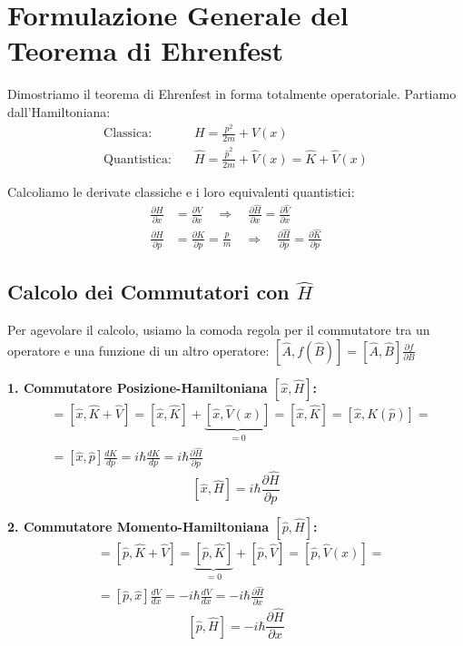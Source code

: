 \documentclass[11pt, a4paper]{article}
\begin{document}
\section{Formulazione Generale del Teorema di Ehrenfest} %

Dimostriamo il teorema di Ehrenfest in forma totalmente operatoriale. Partiamo dall'Hamiltoniana: %
\begin{align*}
    \text{Classica:} \quad & H = \frac{p^2}{2m} + V(x) \\ %
    \text{Quantistica:} \quad & \hat{H} = \frac{\hat{p}^2}{2m} + \hat{V}(x) = \hat{K} + \hat{V}(x) %
\end{align*}

Calcoliamo le derivate classiche e i loro equivalenti quantistici: %
\begin{align*}
    \frac{\partial H}{\partial x} &= \frac{\partial V}{\partial x} \quad \Rightarrow \quad \frac{\partial \hat{H}}{\partial x} = \frac{\partial \hat{V}}{\partial x} \\ %
    \frac{\partial H}{\partial p} &= \frac{\partial K}{\partial p} = \frac{p}{m} \quad \Rightarrow \quad \frac{\partial \hat{H}}{\partial p} = \frac{\partial \hat{K}}{\partial p} %
\end{align*}

\subsection{Calcolo dei Commutatori con $\hat{H}$} %

Per agevolare il calcolo, usiamo la comoda regola per il commutatore tra un operatore e una funzione di un altro operatore: $[\hat{A}, f(\hat{B})] = [\hat{A}, \hat{B}] \frac{\partial f}{\partial B}$ %

\textbf{1. Commutatore Posizione-Hamiltoniana $[\hat{x}, \hat{H}]$:} %
\begin{align*}
    [\hat{x}, \hat{H}] &= [\hat{x}, \hat{K} + \hat{V}] = [\hat{x}, \hat{K}] + \underbrace{ [\hat{x}, \hat{V}(x)] }_{=0} = [\hat{x}, \hat{K}] = [\hat{x}, K(\hat{p})] = \\ %
                       &= [\hat{x}, \hat{p}] \frac{dK}{dp} = i\hbar \frac{dK}{dp} = i\hbar \frac{\partial \hat{H}}{\partial p} %
\end{align*}
\begin{equation}
    \boxed{ [\hat{x}, \hat{H}] = i\hbar \frac{\partial \hat{H}}{\partial p} } %
\end{equation}

\textbf{2. Commutatore Momento-Hamiltoniana $[\hat{p}, \hat{H}]$:} %
\begin{align*}
    [\hat{p}, \hat{H}] &= [\hat{p}, \hat{K} + \hat{V}] = \underbrace{ [\hat{p}, \hat{K}] }_{=0} + [\hat{p}, \hat{V}] = [\hat{p}, \hat{V}(x)] = \\ %
                       &= [\hat{p}, \hat{x}] \frac{dV}{dx} = -i\hbar \frac{dV}{dx} = -i\hbar \frac{\partial \hat{H}}{\partial x} %
\end{align*}
\begin{equation}
    \boxed{ [\hat{p}, \hat{H}] = -i\hbar \frac{\partial \hat{H}}{\partial x} } %
\end{equation}
\end{document}
